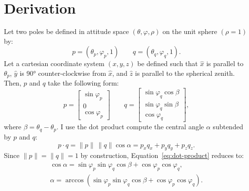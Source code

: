 \chapter{Derivation}\label{app:spherical-cosines}
Let two poles be defined in attitude space $(\theta,\varphi,\rho)$ on the unit sphere $(\rho=1)$ by:
\begin{equation}
    p=(\theta_p,\varphi_p,1)\qquad q=(\theta_q,\varphi_q,1).
\end{equation}
Let a cartesian coordinate system $(x,y,z)$ be defined such that $\hat x$ is parallel to $\theta_p$, $\hat y$ is \ang{90} counter-clockwise from $\hat x$, and $\hat z$ is parallel to the spherical zenith. Then, $p$ and $q$ take the following form: %
\begin{equation}
    p=
    \begin{bmatrix}
        \sin\varphi_p\\
        0\\
        \cos\varphi_p
    \end{bmatrix}
    \qquad
    q=
    \begin{bmatrix}
        \sin\varphi_q\cos\beta\\
        \sin\varphi_q\sin\beta\\
        \cos\varphi_q
    \end{bmatrix},
\end{equation}
where $\beta=\theta_q-\theta_p$. I use the dot product compute the central angle $\alpha$ subtended by $p$ and $q$:
\begin{equation}
    p\cdot q
    =\|p\|\,\|q\|\cos\alpha
    =p_{x}q_{x}
    +p_{y}q_{y}
    +p_{z}q_{z}.\label{eq:dot-product}
\end{equation}
Since $\|p\|=\|q\|=1$ by construction, Equation~\eqref{eq:dot-product} reduces to:
\begin{gather}
    \cos\alpha
    =\sin\varphi_p\sin\varphi_q\cos\beta
    +\cos\varphi_p\cos\varphi_q,\nonumber\\
    \alpha
    =\arccos(\sin\varphi_p\sin\varphi_q\cos\beta
    +\cos\varphi_p\cos\varphi_q).
\end{gather}
%     


